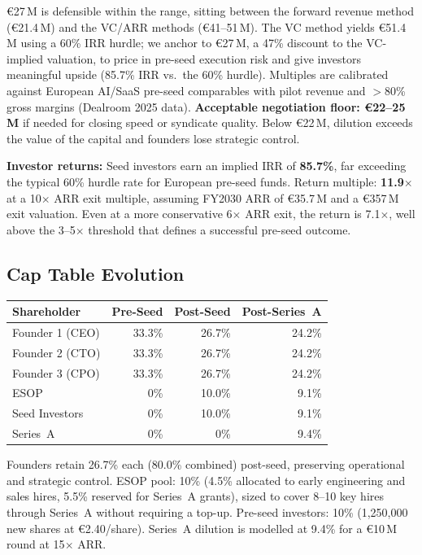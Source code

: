 \documentclass[11pt,a4paper]{article}
\begin{document}
\euro{}27\,M is defensible within the range, sitting between the forward revenue method (\euro{}21.4\,M) and the VC/ARR methods (\euro{}41--51\,M). The VC method yields \euro{}51.4\,M using a 60\% IRR hurdle; we anchor to \euro{}27\,M, a 47\% discount to the VC-implied valuation, to price in pre-seed execution risk and give investors meaningful upside (85.7\% IRR vs.\ the 60\% hurdle). Multiples are calibrated against European AI/SaaS pre-seed comparables with pilot revenue and $>$80\% gross margins (Dealroom 2025 data). \textbf{Acceptable negotiation floor: \euro{}22--25\,M} if needed for closing speed or syndicate quality. Below \euro{}22\,M, dilution exceeds the value of the capital and founders lose strategic control.

\textbf{Investor returns:} Seed investors earn an implied IRR of \textbf{85.7\%}, far exceeding the typical 60\% hurdle rate for European pre-seed funds. Return multiple: \textbf{11.9$\times$} at a 10$\times$ ARR exit multiple, assuming FY2030 ARR of \euro{}35.7\,M and a \euro{}357\,M exit valuation. Even at a more conservative 6$\times$ ARR exit, the return is 7.1$\times$, well above the 3--5$\times$ threshold that defines a successful pre-seed outcome.

\subsection{Cap Table Evolution}

\vspace{-2pt}
\begin{table}[h!]
\centering
\small
\begin{tabularx}{\textwidth}{Xrrr}
\toprule
\textbf{Shareholder} & \textbf{Pre-Seed} & \textbf{Post-Seed} & \textbf{Post-Series~A} \\
\midrule
Founder 1 (CEO) & 33.3\% & 26.7\% & 24.2\% \\
Founder 2 (CTO) & 33.3\% & 26.7\% & 24.2\% \\
Founder 3 (CPO) & 33.3\% & 26.7\% & 24.2\% \\
ESOP & 0\% & 10.0\% & 9.1\% \\
Seed Investors & 0\% & 10.0\% & 9.1\% \\
Series~A & 0\% & 0\% & 9.4\% \\
\bottomrule
\end{tabularx}
\end{table}
\vspace{-2pt}

Founders retain 26.7\% each (80.0\% combined) post-seed, preserving operational and strategic control. ESOP pool: 10\% (4.5\% allocated to early engineering and sales hires, 5.5\% reserved for Series~A grants), sized to cover 8--10 key hires through Series~A without requiring a top-up. Pre-seed investors: 10\% (1,250,000 new shares at \euro{}2.40/share). Series~A dilution is modelled at 9.4\% for a \euro{}10\,M round at 15$\times$ ARR.
\end{document}
